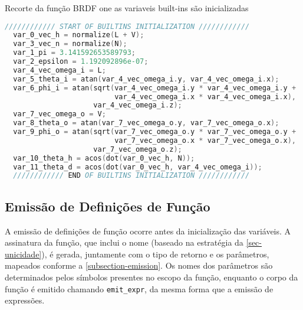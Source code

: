 \begin{codigo}[htb]
    \caption{\small Recorte da função BRDF one as variaveis built-ins são inicializadas }
    \label{cod-builtins-emitted}
\begin{lstlisting}[language=C, frame=none, inputencoding=utf8]
  //////////// START OF BUILTINS INITIALIZATION ////////////
  var_0_vec_h = normalize(L + V);
  var_3_vec_n = normalize(N);
  var_1_pi = 3.141592653589793;
  var_2_epsilon = 1.192092896e-07;
  var_4_vec_omega_i = L;
  var_5_theta_i = atan(var_4_vec_omega_i.y, var_4_vec_omega_i.x);
  var_6_phi_i = atan(sqrt(var_4_vec_omega_i.y * var_4_vec_omega_i.y +
                          var_4_vec_omega_i.x * var_4_vec_omega_i.x),
                     var_4_vec_omega_i.z);
  var_7_vec_omega_o = V;
  var_8_theta_o = atan(var_7_vec_omega_o.y, var_7_vec_omega_o.x);
  var_9_phi_o = atan(sqrt(var_7_vec_omega_o.y * var_7_vec_omega_o.y +
                          var_7_vec_omega_o.x * var_7_vec_omega_o.x),
                     var_7_vec_omega_o.z);
  var_10_theta_h = acos(dot(var_0_vec_h, N));
  var_11_theta_d = acos(dot(var_0_vec_h, var_4_vec_omega_i));
  //////////// END OF BUILTINS INITIALIZATION ////////////
\end{lstlisting}
\end{codigo}




%
%

\subsection{Emissão de Definições de Função}

A emissão de definições de função ocorre antes da inicialização das variáveis. A assinatura da função, que inclui o nome (baseado na estratégia da \autoref{sec-unicidade}), é gerada, juntamente com o tipo de retorno e os parâmetros, mapeados conforme a \autoref{subsection-emission}. Os nomes dos parâmetros são determinados pelos símbolos presentes no escopo da função, enquanto o corpo da função é emitido chamando \verb|emit_expr|, da mesma forma que a emissão de expressões.

